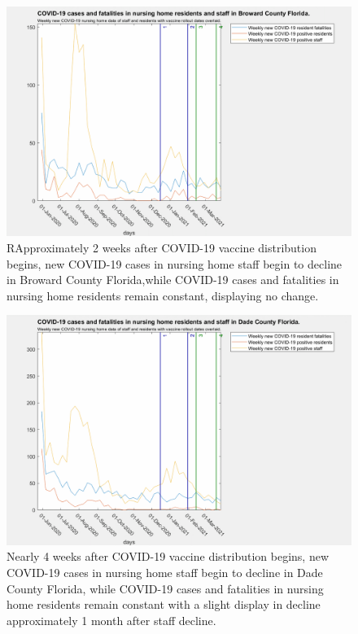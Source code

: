 \documentclass[twoside]{article}
\begin{document}
\begin{multicols}{2}
\begin{figure}[H]
	\includegraphics[width=\linewidth]{images/broward_nursing_home_with_vaccine.png}
	\caption{RApproximately 2 weeks after COVID-19 vaccine distribution begins, new COVID-19 cases in nursing home staff begin to decline in Broward County Florida,while COVID-19 cases and fatalities in nursing home residents remain constant, displaying no change. }
	\label{fig:images/broward_nursing_home_with_vaccineLabel}
\end{figure}

\begin{figure}[H]
	\includegraphics[width=\linewidth]{images/dade_nursing_home_with_vaccine.png}
	\caption{Nearly 4 weeks after COVID-19 vaccine distribution begins, new COVID-19 cases in nursing home staff begin to decline in Dade County Florida, while COVID-19 cases and fatalities in nursing home residents remain constant with a slight display in decline approximately 1 month after staff decline. }
	\label{fig:images/dade_nursing_home_with_vaccineLabel}
\end{figure}


\end{multicols}
\end{document}
